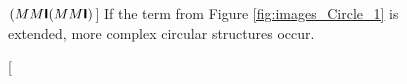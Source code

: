 \begin{figure}[htbp]
{	}
	\caption
	[$(MM\textsf{\textbf{I}}(MM\textsf{\textbf{I}})$]
	{If the term from Figure \ref{fig:images_Circle_1} is extended, 
	more complex circular structures occur.}
	\label{fig:images_Circle_35}
\end{figure}

\clearpage

